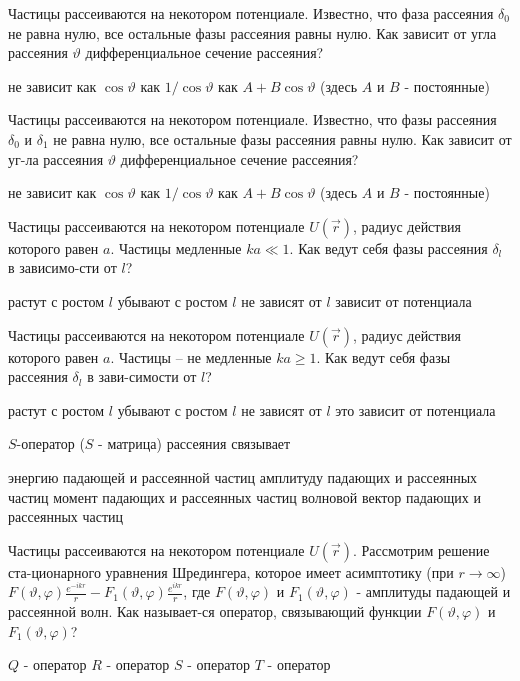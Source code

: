 \documentclass[11pt,a4paper]{exam}
\begin{document}
\begin{questions}
\question Частицы рассеиваются на некотором потенциале. Известно, что фаза рассеяния ${\delta _0}$ не равна нулю, все остальные фазы рассеяния равны нулю. Как зависит от угла рассеяния $\vartheta $ дифференциальное сечение рассеяния?
\begin{choices}
\choice не зависит        
\choice как $\cos \vartheta $
\choice как $1/\cos \vartheta $    
\choice как $A + B\cos \vartheta $ 
(здесь $A$ и $B$ - постоянные)
\end{choices}

\question Частицы рассеиваются на некотором потенциале. Известно, что фазы рассеяния ${\delta _0}$ и ${\delta _1}$ не равна нулю, все остальные фазы рассеяния равны нулю. Как зависит от уг-ла рассеяния $\vartheta $ дифференциальное сечение рассеяния?
\begin{choices}
\choice не зависит        
\choice как $\cos \vartheta $
\choice как $1/\cos \vartheta $    
\choice как $A + B\cos \vartheta $
(здесь $A$ и $B$ - постоянные)
\end{choices}

\question Частицы рассеиваются на некотором потенциале $U(\vec r)$, радиус действия которого равен $a$. Частицы медленные $ka \ll 1$. Как ведут себя фазы рассеяния ${\delta _l}$ в зависимо-сти от $l$?
\begin{choices}
\choice растут с ростом $l$     
\choice убывают с ростом $l$
\choice не зависят от $l$    
\choice зависит от потенциала
\end{choices}

\question Частицы рассеиваются на некотором потенциале $U(\vec r)$, радиус действия которого равен $a$. Частицы – не медленные $ka \ge 1$. Как ведут себя фазы рассеяния ${\delta _l}$ в зави-симости от $l$?
\begin{choices}
\choice растут с ростом $l$     
\choice убывают с ростом $l$
\choice не зависят от $l$    
\choice это зависит от потенциала
\end{choices}

\question $S$-оператор ($S$ - матрица) рассеяния связывает
\begin{choices}
\choice энергию падающей и рассеянной частиц
\choice амплитуду падающих и рассеянных частиц
\choice момент падающих и рассеянных частиц
\choice волновой вектор падающих и рассеянных частиц
\end{choices}

\question Частицы рассеиваются на некотором потенциале $U(\vec r)$. Рассмотрим решение ста-ционарного уравнения Шредингера, которое имеет асимптотику (при $r \to \infty $) $F(\vartheta ,\varphi )\frac{{{e^{ - ikr}}}}{r} - {F_1}(\vartheta ,\varphi )\frac{{{e^{ikr}}}}{r}$, где $F(\vartheta ,\varphi )$ и ${F_1}(\vartheta ,\varphi )$ - амплитуды падающей и рассеянной волн. Как называет-ся оператор, связывающий функции $F(\vartheta ,\varphi )$ и ${F_1}(\vartheta ,\varphi )$?
\begin{choices}
\choice $Q$ - оператор       
\choice $R$ - оператор
\choice $S$ - оператор       
\choice $T$ - оператор
\end{choices}


\end{questions}
\end{document}
